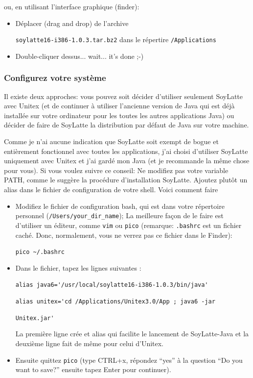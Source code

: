 \bigskip
\noindent ou, en utilisant l'interface graphique (finder):
\begin{itemize}
    \item Déplacer (drag and drop) de l'archive
    
    \noindent \verb+soylatte16-i386-1.0.3.tar.bz2+ dans le répertire \verb+/Applications+
\item Double-cliquer dessus... wait... it's done ;-)
\end{itemize}


\subsubsection{Configurez votre système}
\noindent Il existe deux approches: vous pouvez soit décider d'utiliser seulement SoyLatte avec
Unitex (et de continuer à utiliser l'ancienne version de Java qui est déjà installée sur votre
ordinateur pour les toutes les autres applications Java) ou décider de faire de SoyLatte la
distribution par défaut de Java sur votre machine.

\bigskip
\noindent Comme je n'ai aucune indication que SoyLatte soit exempt de bogue et entièrement
fonctionnel avec toutes les applications, j'ai choisi d'utiliser  SoyLatte uniquement avec Unitex et
j'ai gardé mon Java (et je recommande la même chose pour vous). Si vous voulez suivre ce conseil: Ne
modifiez pas votre variable PATH, comme le suggère la procédure d'installation SoyLatte. Ajoutez
plutôt un alias dans le fichier de configuration de votre shell. Voici comment faire

\begin{itemize}
\item Modifiez le fichier de configuration bash, qui est dans votre répertoire personnel
	(\verb+/Users/your_dir_name+); La meilleure façon de le faire est d'utiliser un éditeur,
	comme \verb+vim+ ou \verb+pico+ (remarque: \verb+.bashrc+ est un fichier caché. Donc, normalement, vous ne verrez pas ce fichier dans le Finder):
    
    \bigskip
    \verb+pico ~/.bashrc+
    
    \item Dans le fichier, tapez les lignes suivantes :
    
    \bigskip
    \verb+alias java6='/usr/local/soylatte16-i386-1.0.3/bin/java'+
    
    \verb+alias unitex='cd /Applications/Unitex3.0/App ; java6 -jar+
    
    \verb+Unitex.jar'+
    
    \bigskip
    \noindent La première ligne crée et alias qui facilite le lancement de 
    SoyLatte-Java et la deuxième ligne fait de même pour celui d'Unitex.
\item Ensuite quittez \verb+pico+ (type CTRL+x, répondez ``yes'' à la question
		``Do you want to save?'' ensuite tapez Enter pour continuer).
\end{itemize}

